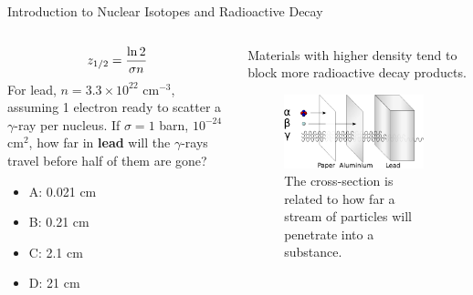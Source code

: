 \documentclass{beamer}
\begin{document}
\begin{frame}{Introduction to Nuclear Isotopes and Radioactive Decay}
\begin{columns}[T]
\begin{column}{0.6\textwidth}
\small
\begin{equation}
z_{\rm 1/2} = \frac{\ln 2}{\sigma n}
\end{equation}
For lead, $n = 3.3 \times 10^{22}$ cm$^{-3}$, assuming 1 electron ready to scatter a $\gamma$-ray per nucleus.  If $\sigma = 1$ barn, $10^{-24}$ cm$^{2}$, how far in \textbf{lead} will the $\gamma$-rays travel before half of them are gone?
\begin{itemize}
\item A: 0.021 cm
\item B: 0.21 cm
\item C: 2.1 cm
\item D: 21 cm
\end{itemize}
\end{column}
\begin{column}{0.4\textwidth}
\footnotesize
Materials with higher density tend to block more radioactive decay products.
\begin{figure}
\centering
\includegraphics[width=0.95\textwidth]{figures/radioactivity.png}
\caption{\label{fig:radio9} The cross-section is related to how far a stream of particles will penetrate into a substance.}
\end{figure}
\end{column}
\end{columns}
\end{frame}
\end{document}
